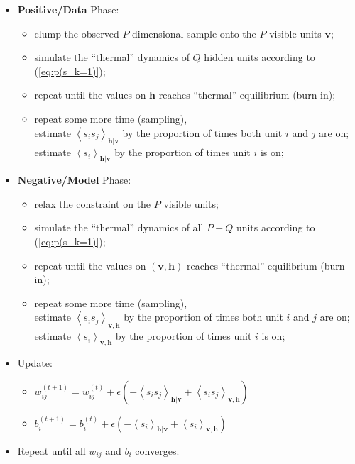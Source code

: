 \documentclass[11pt]{article}
\newcommand{\mean}[2]{\left\langle{#1}\right\rangle_{#2}}
\newcommand{\vh}{\boldsymbol{h}}
\newcommand{\vv}{\boldsymbol{v}}
\begin{document}
{\begin{itemize}
\item \textbf{Positive/Data} Phase:
  \begin{itemize}
  \item clump the observed $P$ dimensional sample onto the $P$ visible units $\vv$;
  \item simulate the ``thermal'' dynamics of $Q$ hidden units according to (\ref{eq:p(s_k=1)});
  \item repeat until the values on $\vh$ reaches ``thermal'' equilibrium (burn in);
  \item repeat some more time (sampling), \\
    estimate $\mean{s_i s_j}{\vh|\vv}$ by the proportion of times both unit $i$ and $j$ are on; \\
    estimate $\mean{s_i}{\vh|\vv}$ by the proportion of times unit $i$ is on;
  \end{itemize}
\item \textbf{Negative/Model} Phase:
  \begin{itemize}
  \item relax the constraint on the $P$ visible units;
  \item simulate the ``thermal'' dynamics of all $P + Q$ units according to (\ref{eq:p(s_k=1)});
  \item repeat until the values on $(\vv, \vh)$ reaches ``thermal'' equilibrium (burn in);
  \item repeat some more time (sampling), \\
    estimate $\mean{s_i s_j}{\vv, \vh}$ by the proportion of times both unit $i$ and $j$ are on; \\
    estimate $\mean{s_i}{\vv, \vh}$ by the proportion of times unit $i$ is on;
  \end{itemize}
\item Update:
  \begin{itemize}
  \item $w_{ij}^{(t+1)} = w_{ij}^{(t)} + \epsilon (-\mean{s_i s_j}{\vh|\vv} + \mean{s_i s_j}{\vv, \vh})$
  \item $b_i^{(t+1)}    = b_i^{(t)}    + \epsilon (-\mean{s_i    }{\vh|\vv} + \mean{s_i    }{\vv, \vh})$
  \end{itemize}
\item Repeat until all $w_{ij}$ and $b_i$ converges.
\end{itemize}
}
\end{document}
